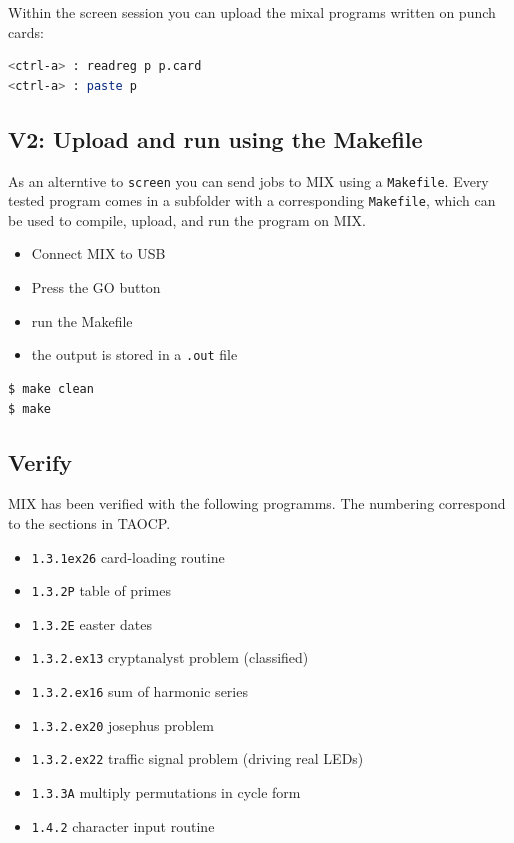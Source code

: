 \documentclass[a4paper,ngerman]{scrartcl}
\begin{document}
Within  the screen session you can upload the mixal programs written on punch cards:
\begin{lstlisting}[language=bash,numbers=none,frame=none]
<ctrl-a> : readreg p p.card
<ctrl-a> : paste p
\end{lstlisting}

\subsection{V2: Upload and run using the Makefile}
As an alterntive to \lstinline|screen| you can send jobs to MIX using a \lstinline|Makefile|. Every tested program comes in a subfolder with a corresponding \lstinline|Makefile|, which can be used to compile, upload, and run the program on MIX.

\begin{itemize}
	\item Connect MIX to USB
	\item Press the GO button
	\item run the Makefile
	\item the output is stored in a \lstinline|.out| file
\end{itemize}

\begin{lstlisting}[numbers=none,frame=none]
$ make clean
$ make
\end{lstlisting}


\subsection{Verify}

MIX has been verified with the following programms. The numbering correspond to the sections in TAOCP.
\begin{itemize}	
\item \lstinline|1.3.1ex26| card-loading routine
\item \lstinline|1.3.2P| table of primes
\item \lstinline|1.3.2E| easter dates
\item \lstinline|1.3.2.ex13| cryptanalyst problem (classified)
\item \lstinline|1.3.2.ex16| sum of harmonic series
\item \lstinline|1.3.2.ex20| josephus problem
\item \lstinline|1.3.2.ex22| traffic signal problem (driving real LEDs)
\item \lstinline|1.3.3A| multiply permutations in cycle form
\item \lstinline|1.4.2|  character input routine
\end{itemize}
\end{document}
